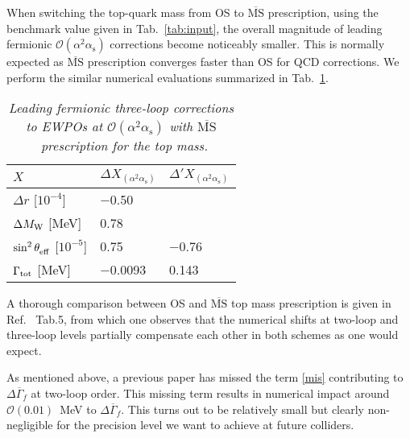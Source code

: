 \documentclass[Physsubmission, Phys]{SciPost}
\def\mathswitchr#1{\relax\ifmmode{\mathrm{#1}}\else$\mathrm{#1}$\fi}
\newcommand{\PW}{\mathswitchr W}
\newcommand{\as}{\alpha_{\mathrm s}}
\newcommand{\seff}[1]{\sin^2\theta_{\rm eff}^{#1}}
\newcommand{\msbar}{$\overline{\mbox{MS}}$}
\newcommand{\OO}{{\mathcal O}}
\newcommand{\mycaption}[1]{\caption{\sl #1}}
\begin{document}
When switching the top-quark mass from OS to {\msbar} prescription, using the benchmark value given in Tab.~\ref{tab:input},  the overall magnitude of leading fermionic $\OO(\alpha^2\as)$ corrections become noticeably smaller. This is normally expected as {\msbar} prescription converges faster than OS for QCD corrections. We perform the similar numerical evaluations summarized in Tab.~\ref{tab:msbarewpos}.

\begin{table}[ht]
\renewcommand{\arraystretch}{1.2}
\centering
\begin{tabular}[t]{|l|l|l|}
\hline
$X$ & $\Delta X_{(\alpha^2\as)}$ & $\Delta' X_{(\alpha^2\as)}$ \\
\hline
$\Delta r$ [$10^{-4}$] &$-$0.50& \\
$\Delta M_{\PW}$ [MeV] & \phantom{$-$}0.78&\\
$\seff{}$ [$10^{-5}$] & \phantom{$-$}0.75 & $-$0.76 \\
$\Gamma_{\rm tot}$ [MeV] & $-$0.0093 & \phantom{$-$}0.143 \\
\hline
\end{tabular}
\mycaption{Leading fermionic three-loop corrections to EWPOs at $\mathcal{O}(\alpha^2\as)$ with \msbar\ prescription for the top mass.}
\label{tab:msbarewpos}
\end{table}
A thorough comparison between OS and {\msbar} top mass prescription is given in Ref.~\cite{Chen:2020xzx} Tab.5, from which one observes that the numerical shifts at two-loop and three-loop levels partially compensate each other in both schemes as one would expect.

As mentioned above, a previous paper has missed the term \eqref{mis} contributing to $\Delta \overline{\Gamma}_f$ at two-loop order. This missing term results in numerical impact around $\OO(0.01)$~MeV to $\Delta \overline{\Gamma}_f$. This turns out to be relatively small but clearly non-negligible for the precision level we want to achieve at future colliders.
\end{document}
